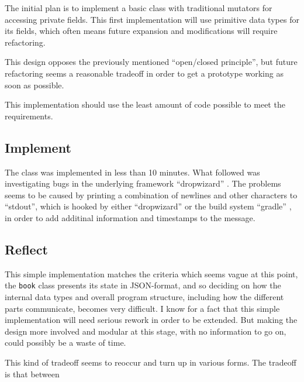 The initial plan is to implement a basic class with traditional mutators for
accessing private fields. This first implementation will use primitive data
types for its fields, which often means future expansion and modifications will
require refactoring. 

This design opposes the previously mentioned ``open/closed principle'', but
future refactoring seems a reasonable tradeoff in order to get a prototype
working as soon as possible.

This implementation should use the least amount of code possible to meet the
requirements.




\subsection{Implement}\label{task-1a-implement}
The class was implemented in less than 10 minutes. What followed was
investigating bugs in the underlying framework ``dropwizard''
\cite{framework:dropwizard}.  The problems seems to be caused by printing a
combination of newlines and other characters to ``stdout'', which is hooked by
either ``dropwizard'' or the build system ``gradle'' \cite{tool:gradle}, in
order to add additinal information and timestamps to the message.


\subsection{Reflect}\label{task-1a-reflect}
This simple implementation matches the criteria which seems vague at this point,
the \texttt{book} class presents its state in JSON-format, and so deciding on
how the internal data types and overall program structure, including how
the different parts communicate, becomes very difficult.
I know for a fact that this simple implementation will need serious rework 
in order to be extended. But making the design more involved and modular
at this stage, with no information to go on, could possibly be a waste of time.

This kind of tradeoff seems to reoccur and turn up in various forms. The tradeoff
is that between 

